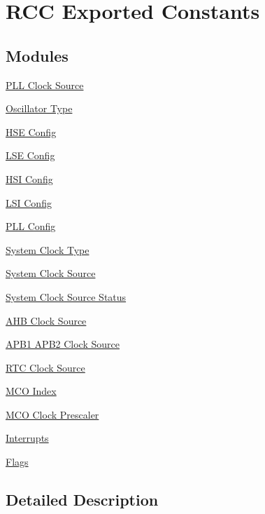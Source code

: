 \hypertarget{group___r_c_c___exported___constants}{}\section{R\+CC Exported Constants}
\label{group___r_c_c___exported___constants}
\subsection*{Modules}
\begin{DoxyCompactItemize}
\item 
\hyperlink{group___r_c_c___p_l_l___clock___source}{P\+L\+L Clock Source}
\item 
\hyperlink{group___r_c_c___oscillator___type}{Oscillator Type}
\item 
\hyperlink{group___r_c_c___h_s_e___config}{H\+S\+E Config}
\item 
\hyperlink{group___r_c_c___l_s_e___config}{L\+S\+E Config}
\item 
\hyperlink{group___r_c_c___h_s_i___config}{H\+S\+I Config}
\item 
\hyperlink{group___r_c_c___l_s_i___config}{L\+S\+I Config}
\item 
\hyperlink{group___r_c_c___p_l_l___config}{P\+L\+L Config}
\item 
\hyperlink{group___r_c_c___system___clock___type}{System Clock Type}
\item 
\hyperlink{group___r_c_c___system___clock___source}{System Clock Source}
\item 
\hyperlink{group___r_c_c___system___clock___source___status}{System Clock Source Status}
\item 
\hyperlink{group___r_c_c___a_h_b___clock___source}{A\+H\+B Clock Source}
\item 
\hyperlink{group___r_c_c___a_p_b1___a_p_b2___clock___source}{A\+P\+B1 A\+P\+B2 Clock Source}
\item 
\hyperlink{group___r_c_c___r_t_c___clock___source}{R\+T\+C Clock Source}
\item 
\hyperlink{group___r_c_c___m_c_o___index}{M\+C\+O Index}
\item 
\hyperlink{group___r_c_c___m_c_ox___clock___prescaler}{M\+C\+O Clock Prescaler}
\item 
\hyperlink{group___r_c_c___interrupt}{Interrupts}
\item 
\hyperlink{group___r_c_c___flag}{Flags}
\end{DoxyCompactItemize}


\subsection{Detailed Description}
